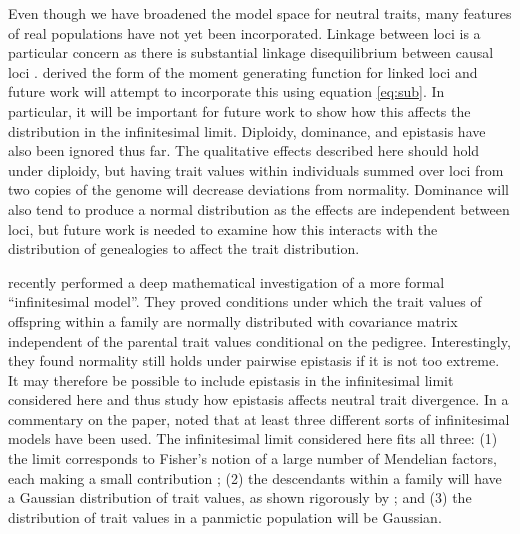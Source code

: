 Even though we have broadened the model space for neutral traits, many features
of real populations have not yet been incorporated. Linkage between loci is a
particular concern as there is substantial linkage disequilibrium between causal
loci \citep{Bulik-Sullivan2015}. \citet{Lohse2011} derived the form of the
moment generating function for linked loci and future work will attempt to
incorporate this using equation \eqref{eq:sub}. In particular, it will be
important for future work to show how this affects the distribution in the
infinitesimal limit. Diploidy, dominance, and epistasis have also been ignored
thus far. The qualitative effects described here should hold under diploidy, but
having trait values within individuals summed over loci from two copies of the
genome will decrease deviations from normality. Dominance will also tend to
produce a normal distribution as the effects are independent between loci, but
future work is needed to examine how this interacts with the distribution of
genealogies to affect the trait distribution.

\citet{Barton2017} recently performed a deep mathematical investigation of a
more formal ``infinitesimal model''. They proved conditions under which the
trait values of offspring within a family are normally distributed with
covariance matrix independent of the parental trait values conditional on the
pedigree. Interestingly, they found normality still holds under pairwise
epistasis if it is not too extreme. It may therefore be possible to include
epistasis in the infinitesimal limit considered here and thus study how
epistasis affects neutral trait divergence. In a commentary on the
\citet{Barton2017} paper, \citet{Turelli2017} noted that at least three
different sorts of infinitesimal models have been used. The infinitesimal limit
considered here fits all three: (1) the limit corresponds to Fisher's notion of
a large number of Mendelian factors, each making a small contribution
\citet{Fisher1918}; (2) the descendants within a family will have a Gaussian
distribution of trait values, as shown rigorously by \citet{Barton2017} ; and
(3) the distribution of trait values in a panmictic population will be Gaussian.

